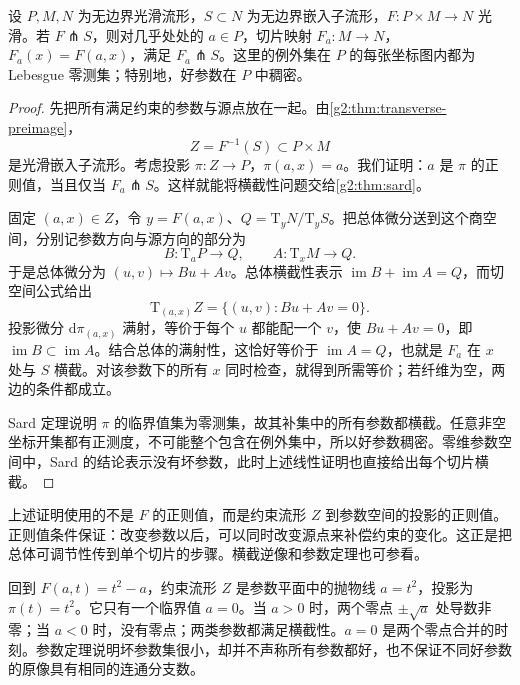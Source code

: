 \begin{theorem}[参数横截性]\label{g2:thm:parametric-transversality}
	设 \(P,M,N\) 为无边界光滑流形，\(S\subset N\) 为无边界嵌入子流形，\(F:P\times M\to N\) 光滑。若 \(F\pitchfork S\)，则对几乎处处的 \(a\in P\)，切片映射 \(F_a:M\to N\)，\(F_a(x)=F(a,x)\)，满足 \(F_a\pitchfork S\)。这里的例外集在 \(P\) 的每张坐标图内都为 Lebesgue 零测集；特别地，好参数在 \(P\) 中稠密。
\end{theorem}
\begin{proof}
	先把所有满足约束的参数与源点放在一起。由\cref{g2:thm:transverse-preimage}，
	\[
		Z=F^{-1}(S)\subset P\times M
	\]
	是光滑嵌入子流形。考虑投影 \(\pi:Z\to P\)，\(\pi(a,x)=a\)。我们证明：\(a\) 是 \(\pi\) 的正则值，当且仅当 \(F_a\pitchfork S\)。这样就能将横截性问题交给\cref{g2:thm:sard}。

	固定 \((a,x)\in Z\)，令 \(y=F(a,x)\)、\(Q=\mathrm{T}_yN/\mathrm{T}_yS\)。把总体微分送到这个商空间，分别记参数方向与源方向的部分为
	\[
		B:\mathrm{T}_aP\longrightarrow Q,\qquad
		A:\mathrm{T}_xM\longrightarrow Q.
	\]
	于是总体微分为 \((u,v)\mapsto Bu+Av\)。总体横截性表示 \(\operatorname{im}B+\operatorname{im}A=Q\)，而切空间公式给出
	\[
		\mathrm{T}_{(a,x)}Z=\{(u,v):Bu+Av=0\}.
	\]
	投影微分 \(\mathrm{d}\pi_{(a,x)}\) 满射，等价于每个 \(u\) 都能配一个 \(v\)，使 \(Bu+Av=0\)，即 \(\operatorname{im}B\subset\operatorname{im}A\)。结合总体的满射性，这恰好等价于 \(\operatorname{im}A=Q\)，也就是 \(F_a\) 在 \(x\) 处与 \(S\) 横截。对该参数下的所有 \(x\) 同时检查，就得到所需等价；若纤维为空，两边的条件都成立。

	Sard 定理说明 \(\pi\) 的临界值集为零测集，故其补集中的所有参数都横截。任意非空坐标开集都有正测度，不可能整个包含在例外集中，所以好参数稠密。零维参数空间中，Sard 的结论表示没有坏参数，此时上述线性证明也直接给出每个切片横截。
\end{proof}

上述证明使用的不是 \(F\) 的正则值，而是约束流形 \(Z\) 到参数空间的投影的正则值。正则值条件保证：改变参数以后，可以同时改变源点来补偿约束的变化。这正是把总体可调节性传到单个切片的步骤。横截逆像和参数定理也可参看\cite[第6章，第143--146页]{Lee2012Smooth}。

\begin{example}\label{g2:exm:parametric-parabola}
	回到 \(F(a,t)=t^2-a\)，约束流形 \(Z\) 是参数平面中的抛物线 \(a=t^2\)，投影为 \(\pi(t)=t^2\)。它只有一个临界值 \(a=0\)。当 \(a>0\) 时，两个零点 \(\pm\sqrt a\) 处导数非零；当 \(a<0\) 时，没有零点；两类参数都满足横截性。\(a=0\) 是两个零点合并的时刻。参数定理说明坏参数集很小，却并不声称所有参数都好，也不保证不同好参数的原像具有相同的连通分支数。
\end{example}

